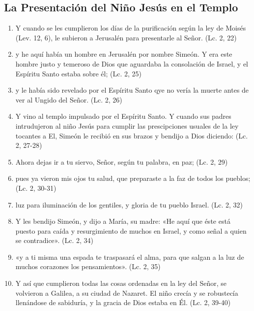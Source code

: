 \documentclass[a4paper,11pt]{article}
\begin{document}
    \subsection*{\hfil La Presentación del Niño Jesús en el Templo \hfil}
      
      \begin{enumerate}
        
        \item Y cuando se les cumplieron los días de la purificación según la ley de Moisés (Lev. 12, 6), 
        le subieron a Jerusalén para presentarle al Señor. (Lc. 2, 22)
        
        \item y he aquí había un hombre en Jerusalén por nombre Simeón. Y era este hombre justo y temeroso de Dios que aguardaba la consolación de Israel, 
        y el Espíritu Santo estaba sobre él; (Lc. 2, 25)
        
        \item y le había sido revelado por el Espíritu Santo qye no vería la muerte antes de ver al Ungido del Señor. (Lc. 2, 26)
        
        \item Y vino al templo impulsado por el Espíritu Santo. Y cuando sus padres intrudujeron al niño Jesús para cumplir las prescipciones usuales
        de la ley tocantes a El, Simeón le recibió en sus brazos y bendijo a Dios diciendo: (Lc. 2, 27-28)
        
        \item Ahora dejas ir a tu siervo, Señor, según tu palabra, en paz; (Lc. 2, 29)

        \item pues ya vieron mis ojos tu salud, que preparaste a la faz de todos los pueblos; (Lc. 2, 30-31)
        
        \item luz para iluminación de los gentiles, y gloria de tu pueblo Israel. (Lc. 2, 32)
        
        \item Y les bendijo Simeón, y dijo a María, su madre: «He aquí que éste está puesto para caída y resurgimiento de muchos en Israel, y como
        señal a quien se contradice». (Lc. 2, 34)
        
        \item «y a ti misma una espada te traspasará el alma, para que salgan a la luz de muchos corazones los pensamientos». (Lc. 2, 35)
        
        \item Y así que cumplieron todas las cosas ordenadas en la ley del Señor, se volvieron a Galilea, a su ciudad de Nazaret. El niño crecía
        y se robustecía llenándose de sabiduría, y la gracia de Dios estaba en Él. (Lc. 2, 39-40)

      \end{enumerate}
            
\end{document}
